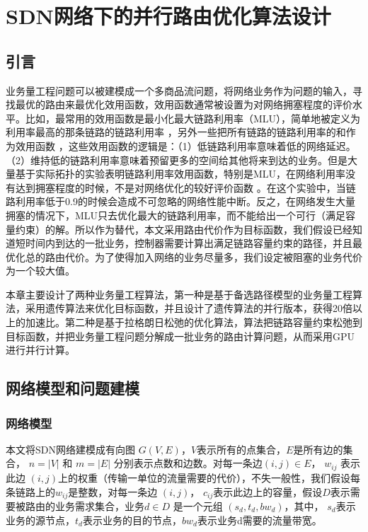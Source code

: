 \chapter{SDN网络下的并行路由优化算法设计}
\section{引言}
业务量工程问题可以被建模成一个多商品流问题，将网络业务作为问题的输入，寻找最优的路由来最优化效用函数，效用函数通常被设置为对网络拥塞程度的评价水平。比如，最常用的效用函数是最小化最大链路利用率（MLU），简单地被定义为利用率最高的那条链路的链路利用率 ，另外一些把所有链路的链路利用率的和作为效用函数 ，这些效用函数的逻辑是：（1）低链路利用率意味着低的网络延迟。（2）维持低的链路利用率意味着预留更多的空间给其他将来到达的业务。但是大量基于实际拓扑的实验表明链路利用率效用函数，特别是MLU，在网络利用率没有达到拥塞程度的时候，不是对网络优化的较好评价函数 。在这个实验中，当链路利用率低于0.9的时候会造成不可忽略的网络性能中断。反之，在网络发生大量拥塞的情况下，MLU只去优化最大的链路利用率，而不能给出一个可行（满足容量约束）的解。所以作为替代，本文采用路由代价作为目标函数，我们假设已经知道短时间内到达的一批业务，控制器需要计算出满足链路容量约束的路径，并且最优化总的路由代价。为了使得加入网络的业务尽量多，我们设定被阻塞的业务代价为一个较大值。

本章主要设计了两种业务量工程算法，第一种是基于备选路径模型的业务量工程算法，采用遗传算法来优化目标函数，并且设计了遗传算法的并行版本，获得20倍以上的加速比。第二种是基于拉格朗日松弛的优化算法，算法把链路容量约束松弛到目标函数，并把业务量工程问题分解成一批业务的路由计算问题，从而采用GPU进行并行计算。
\section{网络模型和问题建模}
\subsection{网络模型}

本文将SDN网络建模成有向图 $G(V, E)$，$V$表示所有的点集合，$E$是所有边的集合， $n = |V|$ 和 $m = |E|$ 分别表示点数和边数。对每一条边$(i,j)\in E$， $w_{ij}$ 表示此边 $(i,j)$上的权重（传输一单位的流量需要的代价），不失一般性，我们假设每条链路上的$w_{ij}$是整数，对每一条边 $(i,j)$， $c_{ij}$表示此边上的容量，假设$D$表示需要被路由的业务需求集合，业务$d \in D$ 是一个元组 $(s_d, t_d, bw_d)$，其中， $s_d$表示业务的源节点，$t_d$表示业务的目的节点，$bw_d$表示业务d需要的流量带宽。
